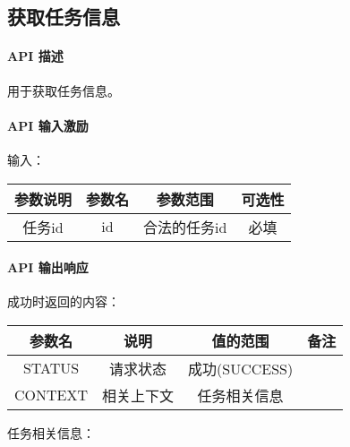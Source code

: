 \documentclass[UTF8]{dingo}
\def\apiintr{\paragraph{\colorbox[rgb]{1.0,0.6,0.65}{API 描述}}} %
\def\apiexc{\paragraph{\colorbox[rgb]{1,0.85,0.45}{API 输入激励}}} %
\def\apiresp{\paragraph{\colorbox[rgb]{0.9,0.9,1}{API 输出响应}}} %
\def\成功{\colorbox[rgb]{0.4,1,0.5}{成功}}
\def\成功V{成功(SUCCESS)}
\begin{document}
    \subsection{获取任务信息}
    \apiintr
    用于获取任务信息。
    \apiexc
    输入：\\
    \begin{tabular}{|c|c|c|c|}
        \hline \rule[-2ex]{0pt}{5.5ex} 参数说明 & 参数名 & 参数范围 & 可选性 \\
        \hline \rule[-2ex]{0pt}{5.5ex} 任务id & id & 合法的任务id & 必填 \\
        \hline
    \end{tabular}
    \apiresp
    \成功 时返回的内容：\\
    \begin{tabular}{|c|c|c|c|}
        \hline \rule[-2ex]{0pt}{5.5ex} 参数名 & 说明 & 值的范围 & 备注 \\
        \hline \rule[-2ex]{0pt}{5.5ex} STATUS & 请求状态 & \成功V &  \\
        \hline \rule[-2ex]{0pt}{5.5ex} CONTEXT & 相关上下文 & 任务相关信息 &  \\
        \hline
    \end{tabular}
    \par 任务相关信息： \\
\end{document}
